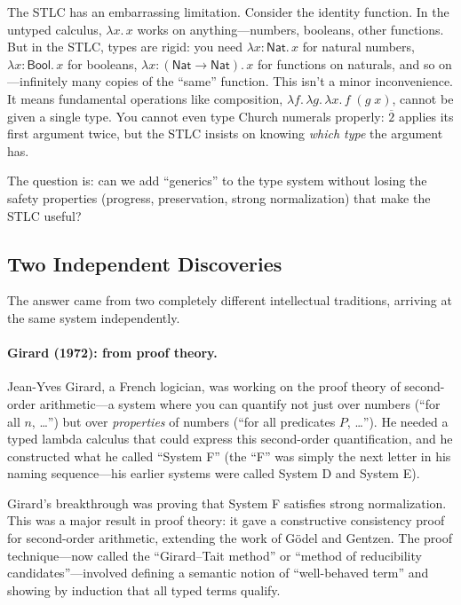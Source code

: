 \documentclass[11pt,a4paper]{article}
\theoremstyle{definition}
\newcommand{\lam}{\lambda}
\newcommand{\church}[1]{\overline{#1}}
\begin{document}
The STLC has an embarrassing limitation. Consider the identity function. In the
untyped calculus, $\lam x.\, x$ works on anything---numbers, booleans, other
functions. But in the STLC, types are rigid: you need $\lam x{:}\textsf{Nat}.\, x$
for natural numbers, $\lam x{:}\textsf{Bool}.\, x$ for booleans,
$\lam x{:}(\textsf{Nat} \to \textsf{Nat}).\, x$ for functions on naturals,
and so on---infinitely many copies of the ``same'' function. This isn't a minor
inconvenience. It means fundamental operations like composition,
$\lam f.\, \lam g.\, \lam x.\, f\;(g\;x)$, cannot be given a single type. You
cannot even type Church numerals properly: $\church{2}$ applies its first
argument twice, but the STLC insists on knowing \emph{which type} the argument
has.

The question is: can we add ``generics'' to the type system without losing the
safety properties (progress, preservation, strong normalization) that make the
STLC useful?

\subsection{Two Independent Discoveries}

The answer came from two completely different intellectual traditions, arriving
at the same system independently.

\paragraph{Girard (1972): from proof theory.} Jean-Yves Girard, a French
logician, was working on the proof theory of second-order arithmetic---a system
where you can quantify not just over numbers (``for all $n$, \ldots'') but over
\emph{properties} of numbers (``for all predicates $P$, \ldots''). He needed a
typed lambda calculus that could express this second-order quantification, and he
constructed what he called ``System F'' (the ``F'' was simply the next letter
in his naming sequence---his earlier systems were called System D and System E).

Girard's breakthrough was proving that System F satisfies strong normalization.
This was a major result in proof theory: it gave a constructive consistency
proof for second-order arithmetic, extending the work of G\"odel and Gentzen.
The proof technique---now called the ``Girard--Tait method'' or ``method of
reducibility candidates''---involved defining a semantic notion of
``well-behaved term'' and showing by induction that all typed terms qualify.
\end{document}
